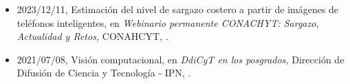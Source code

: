 \begin{itemize} 
\item 2023/12/11, Estimación del nivel de sargazo costero a partir de imágenes de teléfonos inteligentes, en \textit{ Webinario permanente CONACHYT: Sargazo, Actualidad y Retos,} CONAHCYT, \href{https://www.youtube.com/live/yUQVG91bFkw?si=Yl2jPZaK_AEKFwS0}{\faYoutubePlay}.
\item 2021/07/08, Visión computacional, en \textit{ DdiCyT en los posgrados,} Dirección de Difusión de Ciencia y Tecnología - IPN, \href{https://youtu.be/ProuWh_Dxxo?si=ncj98MkDQYDJ6wdt}{\faYoutubePlay}.
\end{itemize} 

